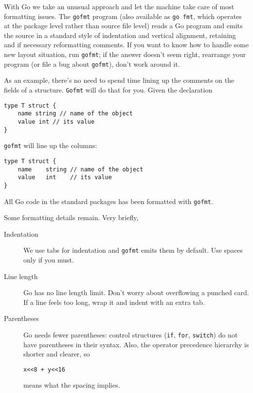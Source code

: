 With Go we take an unusual approach and let the machine take care of
most formatting issues. The \texttt{gofmt} program (also available as
\texttt{go fmt}, which operates at the package level rather than source
file level) reads a Go program and emits the source in a standard style
of indentation and vertical alignment, retaining and if necessary
reformatting comments. If you want to know how to handle some new layout
situation, run \texttt{gofmt}; if the answer doesn't seem right,
rearrange your program (or file a bug about \texttt{gofmt}), don't work
around it.

As an example, there's no need to spend time lining up the comments on
the fields of a structure. \texttt{Gofmt} will do that for you. Given
the declaration

\begin{Verbatim}[frame=single]
type T struct {
    name string // name of the object
    value int // its value
}
\end{Verbatim}

\texttt{gofmt} will line up the columns:

\begin{Verbatim}[frame=single]
type T struct {
    name    string // name of the object
    value   int    // its value
}
\end{Verbatim}

All Go code in the standard packages has been formatted with
\texttt{gofmt}.

Some formatting details remain. Very briefly,

\begin{description}
\item[Indentation]
We use tabs for indentation and \texttt{gofmt} emits them by default.
Use spaces only if you must.
\item[Line length]
Go has no line length limit. Don't worry about overflowing a punched
card. If a line feels too long, wrap it and indent with an extra tab.
\item[Parentheses]
Go needs fewer parentheses: control structures (\texttt{if},
\texttt{for}, \texttt{switch}) do not have parentheses in their syntax.
Also, the operator precedence hierarchy is shorter and clearer, so

\begin{Verbatim}[frame=single]
x<<8 + y<<16
\end{Verbatim}

means what the spacing implies.
\end{description}

